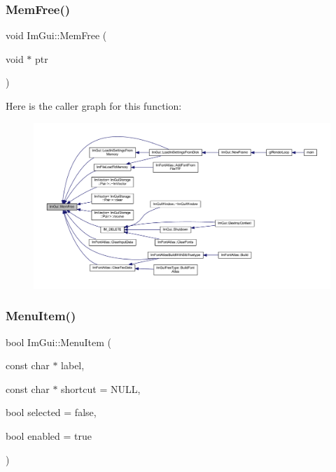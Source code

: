 \subsubsection{\texorpdfstring{Mem\+Free()}{MemFree()}}
{\footnotesize\ttfamily void Im\+Gui\+::\+Mem\+Free (\begin{DoxyParamCaption}\item[{void $\ast$}]{ptr }\end{DoxyParamCaption})}

Here is the caller graph for this function\+:
\nopagebreak
\begin{figure}[H]
\begin{center}
\leavevmode
\includegraphics[width=350pt]{namespace_im_gui_a269ec695c6e722ec3da85dae37f0675d_icgraph}
\end{center}
\end{figure}
\mbox{\label{namespace_im_gui_aa1bae511ca47478998693a9d8c84f2e6}} 
\subsubsection{\texorpdfstring{Menu\+Item()}{MenuItem()}\hspace{0.1cm}{\footnotesize\ttfamily [1/2]}}
{\footnotesize\ttfamily bool Im\+Gui\+::\+Menu\+Item (\begin{DoxyParamCaption}\item[{const char $\ast$}]{label,  }\item[{const char $\ast$}]{shortcut = {\ttfamily NULL},  }\item[{bool}]{selected = {\ttfamily false},  }\item[{bool}]{enabled = {\ttfamily true} }\end{DoxyParamCaption})}

